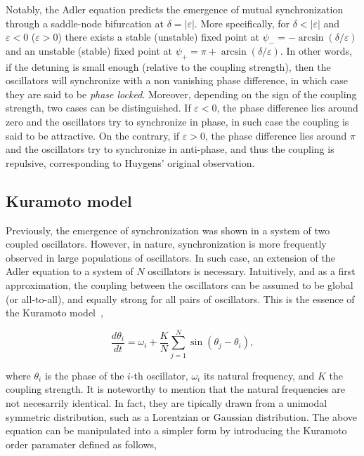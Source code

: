 Notably, the Adler equation predicts the emergence of mutual synchronization through a saddle-node
bifurcation at $\delta = |\varepsilon|$. More specifically, for $\delta < |\varepsilon|$
and $\varepsilon < 0$ ($\varepsilon > 0$) there exists 
a stable (unstable) fixed point at $\psi_{-} = -\arcsin(\delta/\varepsilon)$ and an unstable (stable)
fixed point at $\psi_{+} = \pi + \arcsin(\delta/\varepsilon)$. In other words, if the detuning
is small enough (relative to the coupling strength), then the oscillators will synchronize with
a non vanishing phase difference, in which case they are said to be {\em phase locked}. Moreover,
depending on the sign of the coupling strength, two cases can be distinguished. If $\varepsilon < 0$,
the phase difference lies around zero and the oscillators try to synchronize in phase, in such
case the coupling is said to be attractive. On the contrary,  if $\varepsilon > 0$, the phase difference
lies around $\pi$ and the oscillators try to synchronize in anti-phase, and thus the coupling is
repulsive, corresponding to Huygens' original observation.


\subsection{Kuramoto model}

Previously, the emergence of synchronization was shown in a system of two coupled oscillators.
However, in nature, synchronization is more frequently observed in large populations of oscillators. In such case,
an extension of the Adler equation to a system of $N$ oscillators is necessary. Intuitively,
and as a first approximation, the coupling between the oscillators can be assumed to be global (or all-to-all),
and equally strong for all pairs of oscillators. This is the essence of the Kuramoto 
model~\cite{kuramoto1975model,kuramoto1984chemical},

\begin{equation}
    \dfrac{d\theta_i}{dt} = \omega_i + \dfrac{K}{N} \sum_{j=1}^{N} \sin(\theta_j - \theta_i),
    \label{eq:pre_kuramoto}
\end{equation}

\noindent where $\theta_i$ is the phase of the $i$-th oscillator, $\omega_i$ its natural frequency, and $K$ the coupling strength.
It is noteworthy to mention that the natural frequencies are not necesarrily identical. In fact, they
are tipically drawn from a unimodal symmetric distribution, such as a Lorentzian or Gaussian distribution.
The above equation can be manipulated into a simpler form by introducing the Kuramoto order paramater
defined as follows,

